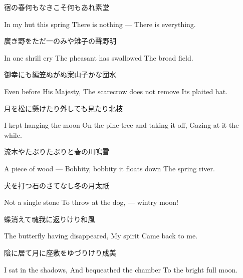 \begin{haiku}
    {\FH 宿の春何もなきこそ何もあれ}\hfill{\FH 素堂}

    \vin{} In my hut this spring
    \vin{} \vin{} There is nothing ---
    \vin{} \vin{} \vin{} There is everything.
\end{haiku}

\begin{haiku}
    {\FH 廣き野をただ一のみや雉子の聲}\hfill{\FH 野明}

    \vin{} In one shrill cry
    \vin{} \vin{} The pheasant has swallowed
    \vin{} \vin{} \vin{} The broad field.
\end{haiku}

\begin{haiku}
    {\FH 御幸にも編笠ぬがぬ案山子かな}\hfill{\FH 団水}

    \vin{} Even before His Majesty,
    \vin{} \vin{} The scarecrow does not remove
    \vin{} \vin{} \vin{} Its plaited hat.
\end{haiku}

\begin{haiku}
    {\FH 月を松に懸けたり外しても見たり}\hfill{\FH 北枝}

    \vin{} I kept hanging the moon
    \vin{} \vin{} On the pine-tree and taking it off,
    \vin{} \vin{} \vin{} Gazing at it the while.
\end{haiku}

\begin{haiku}
    {\FH 流木やたぶりたぶりと春の川}\hfill{\FH 鳴雪}

    \vin{} A piece of wood ---
    \vin{} \vin{} Bobbity, bobbity it floats down
    \vin{} \vin{} \vin{} The spring river.
\end{haiku}

\begin{haiku}
    {\FH 犬を打つ石のさてなし冬の月}\hfill{\FH 太祇}

    \vin{} Not a single stone
    \vin{} \vin{} To throw at the dog, ---
    \vin{} \vin{} \vin{} wintry moon!
\end{haiku}

\begin{haiku}
    {\FH 蝶消えて魂我に返りけり}\hfill{\FH 和風}

    \vin{} The butterfly having disappeared,
    \vin{} \vin{} My spirit
    \vin{} \vin{} \vin{} Came back to me.
\end{haiku}

\begin{haiku}
    {\FH 陰に居て月に座敷をゆづりけり}\hfill{\FH 成美}

    \vin{} I sat in the shadows,
    \vin{} \vin{} And bequeathed the chamber
    \vin{} \vin{} \vin{} To the bright full moon.
\end{haiku}

